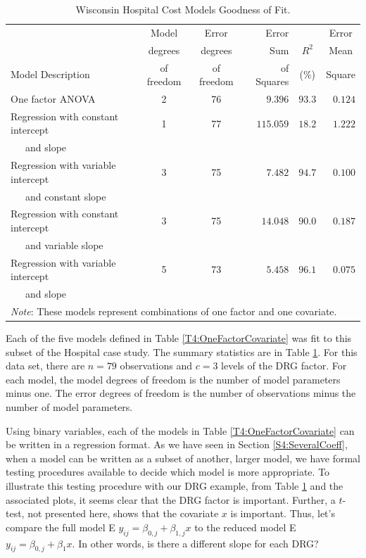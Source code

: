 \begin{table}[h]
\caption{\label{T4:DRGModels} Wisconsin Hospital Cost Models
Goodness of Fit.}
\begin{tabular}{lccrcc}
\hline & Model & Error & Error  &  & Error  \\
& degrees & degrees
& Sum & $R^2$  & Mean \\
Model Description & of freedom & of freedom & of Squares & (\%) &
Square
\\ \hline
One factor ANOVA & 2 &
76 & \multicolumn{1}{r}{$9.396$} & \multicolumn{1}{r}{$%
93.3$} & \multicolumn{1}{r}{$0.124$} \\
Regression with constant intercept & 1 & 77 &
\multicolumn{1}{r}{$115.059$} &
\multicolumn{1}{r}{$18.2$} & \multicolumn{1}{r}{$1.222$} \\
~~~and slope & & & & &  \\
Regression with variable intercept &3 & 75 &
\multicolumn{1}{r}{$7.482$} &
\multicolumn{1}{r}{$94.7$} & \multicolumn{1}{r}{$0.100$} \\
~~~and constant slope &  & &  &  &  \\
Regression with constant intercept & 3 & 75 &
\multicolumn{1}{r}{$14.048$} &
\multicolumn{1}{r}{$90.0$} & \multicolumn{1}{r}{$0.187$} \\
~~~and variable slope &  &  &  &  & \\
Regression with variable intercept & 5 & 73 &
\multicolumn{1}{r}{$5.458$} &
\multicolumn{1}{r}{$96.1$} & \multicolumn{1}{r}{$0.075$} \\
~~~and slope &  & & &  &  \\
\hline \multicolumn{6}{l}{\textit{Note}: These models represent
combinations of one factor and one covariate.} \\
\end{tabular}

\end{table}

Each of the five models defined in Table \ref{T4:OneFactorCovariate}
was fit to this subset of the Hospital case study. The summary
statistics are in Table \ref{T4:DRGModels}. For this data set, there
are $n=79$ observations and $c=3$ levels of the DRG factor. For each
model, the model degrees of freedom is the number of model
parameters minus one. The error degrees of freedom is the number of
observations minus the number of model parameters.

Using binary variables, each of the models in Table
\ref{T4:OneFactorCovariate} can be written in a regression format.
As we have seen in Section \ref{S4:SeveralCoeff}, when a model can
be written as a subset of another, larger model, we have formal
testing procedures available to decide which model is more
appropriate. To illustrate this testing procedure with our DRG
example, from Table \ref{T4:DRGModels} and the associated plots, it
seems clear that the DRG factor is important. Further, a $t$-test,
not presented here, shows that the covariate $x$ is important. Thus,
let's compare the full model E $y_{ij} = \beta_{0,j} + \beta_{1,j}x$
to the reduced model E $y_{ij}=\beta_{0,j}+\beta_1x$. In other
words, is there a different slope for each DRG?

